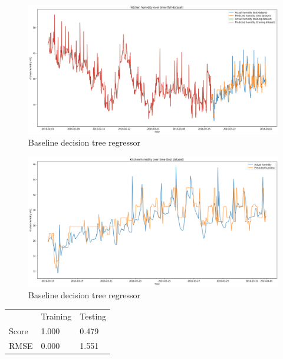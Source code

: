 \documentclass[9.5pt]{beamer}
\begin{document}
    \begin{frame}{}
        \begin{figure}
            \centering
            \includegraphics[width=\linewidth]{images/full}
            \caption{Baseline decision tree regressor}
        \end{figure}
    \end{frame}
    \begin{frame}{}
        \begin{figure}
            \centering
            \includegraphics[width=\linewidth]{images/baseline_tree}
            \caption{Baseline decision tree regressor}
        \end{figure}
        \small
        \begin{table}
            \begin{tabular}{l l l}
                & Training & Testing \\
                Score & 1.000    & 0.479   \\
                RMSE  & 0.000    & 1.551
            \end{tabular}
        \end{table}
    \end{frame}
\end{document}
